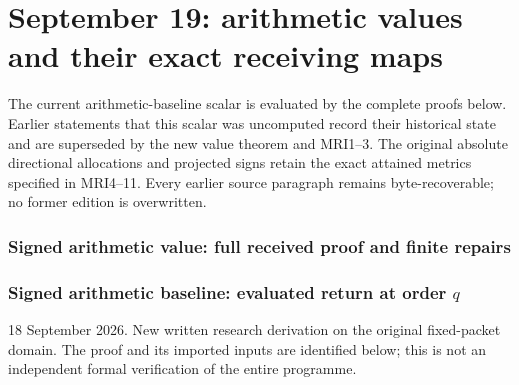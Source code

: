 \begingroup
\clearpage
\part{September 19: arithmetic values and their exact receiving maps}
\noindent The current arithmetic-baseline scalar is evaluated by the complete
proofs below. Earlier statements that this scalar was uncomputed record their
historical state and are superseded by the new value theorem and MRI1--3.
The original absolute directional allocations and projected signs retain the
exact attained metrics specified in MRI4--11. Every earlier source paragraph
remains byte-recoverable; no former edition is overwritten.
\providecommand{\tightlist}{\setlength{\itemsep}{0pt}\setlength{\parskip}{0pt}}
\providecommand{\C}{\mathbb C}\providecommand{\R}{\mathbb R}
\providecommand{\Z}{\mathbb Z}\providecommand{\Q}{\mathbb Q}
\providecommand{\N}{\mathbb N}
\providecommand{\im}{\operatorname{im}}
\providecommand{\diag}{\operatorname{diag}}
\providecommand{\Gr}{\operatorname{Gram}}
\providecommand{\Gram}{\operatorname{Gram}}
\providecommand{\Res}{\operatorname{Res}}
\providecommand{\cond}{\operatorname{cond}}
\providecommand{\ExtensionTok}[1]{#1}\providecommand{\NormalTok}[1]{#1}
\providecommand{\StringTok}[1]{#1}\providecommand{\BuiltInTok}[1]{#1}
\providecommand{\ControlFlowTok}[1]{#1}

\clearpage
\begingroup


\setcounter{equation}{0}
\renewcommand{\theequation}{SA.\arabic{equation}}
\section*{Signed arithmetic value: full received proof and finite repairs}


\section{\texorpdfstring{Signed arithmetic baseline: evaluated return at
order
\(q\)}{Signed arithmetic baseline: evaluated return at order q}}\label{sa:signed-arithmetic-baseline-evaluated-return-at-order-q}

18 September 2026. New written research derivation on the original
fixed-packet domain. The proof and its imported inputs are identified
below; this is not an independent formal verification of the entire
programme.

